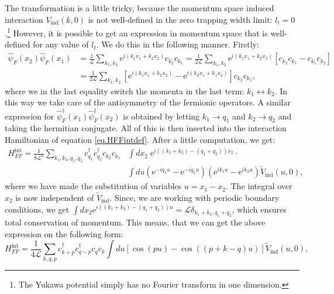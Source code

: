 The transformation is a little tricky, because the momentum space induced interaction $V_{\text{ind}}(k, 0)$ is not well-defined in the zero trapping width limit: $l_t = 0$.\footnote{The Yukawa potential simply has no Fourier transform in one dimension.} However, it is possible to get an expression in momentum space that is well-defined for any value of $l_t$. We do this in the following manner. Firstly:
\begin{align}
\hat{\psi}_F(x_2) \hat{\psi}_F(x_1) &= \frac{1}{\mathcal{L}}\sum_{k_1,k_2} \text{e}^{i(k_1x_1 + k_2x_2)} c_{k_2}c_{k_1} = \frac{1}{2\mathcal{L}}\sum_{k_1,k_2} \text{e}^{i(k_1x_1 + k_2x_2)} \left[c_{k_2}c_{k_1} - c_{k_1}c_{k_2}\right] \nonumber \\
&= \frac{1}{2\mathcal{L}}\sum_{k_1,k_2} \left[\text{e}^{i(k_1x_1 + k_2x_2)} - \text{e}^{i(k_2x_1 + k_1x_2)}\right]c_{k_2}c_{k_1}, \nonumber
\end{align}
where we in the last equality switch the momenta in the last term: $k_1 \leftrightarrow k_2$. In this way we take care of the antisymmetry of the fermionic operators. A similar expression for $\hat{\psi}^\dagger_F(x_1)\hat{\psi}^\dagger_F(x_2)$ is obtained by letting $k_1 \to q_1$ and $k_2 \to q_2$ and taking the hermitian conjugate. All of this is then inserted into the interaction Hamiltonian of equation \eqref{eq.HFFintdef}. After a little computation, we get:
\begin{align}
H^\text{int}_{FF} = \frac{1}{8\mathcal{L}^2} \sum_{k_1,k_2,q_1,q_2} c^\dagger_{q_1}c^\dagger_{q_2}c_{k_2}c_{k_1} & \int dx_2 \; \text{e}^{i((k_1+k_2)-(q_1+q_2))x_2}\cdot \nonumber \\ 
&\int du\left(\text{e}^{-iq_1u} - \text{e}^{-iq_2u}\right)\left(\text{e}^{ik_1u} - \text{e}^{ik_2u}\right)\tilde{V}_\text{ind}(u,0), \nonumber
\end{align}
where we have made the substitution of variables $u = x_1 - x_2$. The integral over $x_2$ is now independent of $\tilde{V}_{\text{ind}}$. Since, we are working with periodic boundary conditions, we get $\int dx_2 \text{e}^{i((k_1+k_2)-(q_1+q_2))u} = \mathcal{L}\delta_{k_1+k_2,q_1+q_2}$, which ensures total conservation of momentum. This means, that we can get the above expression on the following form: 
\begin{equation}
H^\text{int}_{FF} = \frac{1}{4\mathcal{L}} \sum_{k,q,p} c^\dagger_{k+p}c^\dagger_{q-p}c_{q}c_{k} \int du\left[\cos\left(pu\right) - \cos\left(\left( p + k - q \right)u\right)\right]\tilde{V}_{\text{ind}}(u,0), \nonumber
\end{equation}
